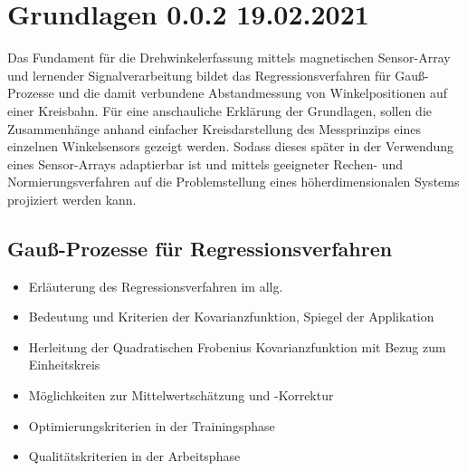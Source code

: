 %

\chapter{Grundlagen 0.0.2 19.02.2021}\label{ch:grundlagen}

Das Fundament für die Drehwinkelerfassung mittels magnetischen Sensor-Array und lernender Signalverarbeitung 
\cite{Schuethe2019}\cite{Schuethe2020a}\cite{Schuethe2020} bildet das Regressionsverfahren für Gauß-Prozesse 
\cite{Rasmussen2006} und die damit verbundene Abstandmessung von Winkelpositionen auf einer Kreisbahn.
Für eine anschauliche Erklärung der Grundlagen, sollen die Zusammenhänge anhand einfacher Kreisdarstellung des 
Messprinzips eines einzelnen Winkelsensors gezeigt werden. Sodass dieses später in der Verwendung eines Sensor-Arrays 
adaptierbar ist und mittels geeigneter Rechen- und Normierungsverfahren auf die Problemstellung eines 
höherdimensionalen Systems projiziert werden kann.













\section{Gauß-Prozesse für Regressionsverfahren}\label{sec:gauss-prozesse-regressionsverfahren}
	\begin{itemize}
		\item Erläuterung des Regressionsverfahren im allg.
		\item Bedeutung und Kriterien der Kovarianzfunktion, Spiegel der Applikation
		\item Herleitung der Quadratischen Frobenius Kovarianzfunktion mit Bezug zum Einheitskreis
		\item Möglichkeiten zur Mittelwertschätzung und -Korrektur
		\item Optimierungskriterien in der Trainingsphase
		\item Qualitätskriterien in der Arbeitsphase
	\end{itemize}
